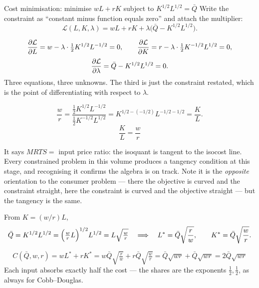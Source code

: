 \begin{worked}{Cost minimisation: minimise $wL+rK$ subject to $K^{1/2}L^{1/2}=\bar Q$}
Write the constraint as ``constant minus function equals zero'' and attach
the multiplier:
\[
  \mathcal L(L,K,\lambda)=wL+rK+\lambda\bigl(\bar Q-K^{1/2}L^{1/2}\bigr).
\]

\[
  \frac{\partial \mathcal L}{\partial L}=w-\lambda\cdot\tfrac12K^{1/2}L^{-1/2}=0,
  \qquad
  \frac{\partial \mathcal L}{\partial K}=r-\lambda\cdot\tfrac12K^{-1/2}L^{1/2}=0,
\]
\[
  \frac{\partial \mathcal L}{\partial \lambda}=\bar Q-K^{1/2}L^{1/2}=0 .
\]
Three equations, three unknowns. The third is just the constraint restated,
which is the point of differentiating with respect to $\lambda$.

\[
  \frac{w}{r}
  =\frac{\tfrac12K^{1/2}L^{-1/2}}{\tfrac12K^{-1/2}L^{1/2}}
  =K^{1/2-(-1/2)}L^{-1/2-1/2}
  =\frac{K}{L} .
\]
\[
  \boxed{\frac{K}{L}=\frac{w}{r}}
\]

It says $MRTS=$ input price ratio: the isoquant is tangent to the isocost
line. Every constrained problem in this volume produces a tangency
condition at this stage, and recognising it confirms the algebra is on
track. Note it is the \emph{opposite} orientation to the consumer problem
--- there the objective is curved and the constraint straight, here the
constraint is curved and the objective straight --- but the tangency is the
same.

From $K=(w/r)L$,
\[
  \bar Q=K^{1/2}L^{1/2}=\Bigl(\tfrac wr L\Bigr)^{1/2}L^{1/2}
        =L\sqrt{\tfrac wr}
  \quad\Longrightarrow\quad
  L^{*}=\bar Q\sqrt{\frac rw},
  \qquad
  K^{*}=\bar Q\sqrt{\frac wr} .
\]

\[
  C(\bar Q,w,r)=wL^{*}+rK^{*}
  =w\bar Q\sqrt{\tfrac rw}+r\bar Q\sqrt{\tfrac wr}
  =\bar Q\sqrt{wr}+\bar Q\sqrt{wr}
  =\boxed{2\bar Q\sqrt{wr}}
\]
Each input absorbs exactly half the cost --- the shares are the exponents
$\tfrac12,\tfrac12$, as always for Cobb--Douglas.


\end{worked}

